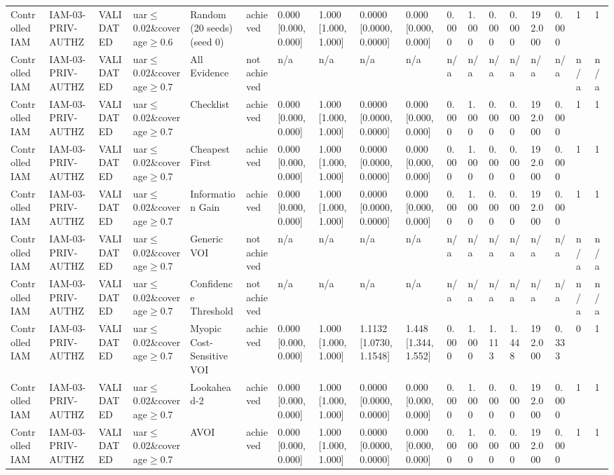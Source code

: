 \begin{table}[!ht]
{\begin{tabular}{llllllllllllllllll}
Controlled IAM & IAM-03-PRIV-AUTHZ & VALIDATED & uar$\le$0.02\&coverage$\ge$0.6 & Random (20 seeds) (seed 0) & achieved & 0.000 [0.000, 0.000] & 1.000 [1.000, 1.000] & 0.0000 [0.0000, 0.0000] & 0.000 [0.000, 0.000] & 0.000 & 1.000 & 0.000 & 0.000 & 192.000 & 0.000 & 1 & 1 \\
Controlled IAM & IAM-03-PRIV-AUTHZ & VALIDATED & uar$\le$0.02\&coverage$\ge$0.7 & All Evidence & not achieved & n/a & n/a & n/a & n/a & n/a & n/a & n/a & n/a & n/a & n/a & n/a & n/a \\
Controlled IAM & IAM-03-PRIV-AUTHZ & VALIDATED & uar$\le$0.02\&coverage$\ge$0.7 & Checklist & achieved & 0.000 [0.000, 0.000] & 1.000 [1.000, 1.000] & 0.0000 [0.0000, 0.0000] & 0.000 [0.000, 0.000] & 0.000 & 1.000 & 0.000 & 0.000 & 192.000 & 0.000 & 1 & 1 \\
Controlled IAM & IAM-03-PRIV-AUTHZ & VALIDATED & uar$\le$0.02\&coverage$\ge$0.7 & Cheapest First & achieved & 0.000 [0.000, 0.000] & 1.000 [1.000, 1.000] & 0.0000 [0.0000, 0.0000] & 0.000 [0.000, 0.000] & 0.000 & 1.000 & 0.000 & 0.000 & 192.000 & 0.000 & 1 & 1 \\
Controlled IAM & IAM-03-PRIV-AUTHZ & VALIDATED & uar$\le$0.02\&coverage$\ge$0.7 & Information Gain & achieved & 0.000 [0.000, 0.000] & 1.000 [1.000, 1.000] & 0.0000 [0.0000, 0.0000] & 0.000 [0.000, 0.000] & 0.000 & 1.000 & 0.000 & 0.000 & 192.000 & 0.000 & 1 & 1 \\
Controlled IAM & IAM-03-PRIV-AUTHZ & VALIDATED & uar$\le$0.02\&coverage$\ge$0.7 & Generic VOI & not achieved & n/a & n/a & n/a & n/a & n/a & n/a & n/a & n/a & n/a & n/a & n/a & n/a \\
Controlled IAM & IAM-03-PRIV-AUTHZ & VALIDATED & uar$\le$0.02\&coverage$\ge$0.7 & Confidence Threshold & not achieved & n/a & n/a & n/a & n/a & n/a & n/a & n/a & n/a & n/a & n/a & n/a & n/a \\
Controlled IAM & IAM-03-PRIV-AUTHZ & VALIDATED & uar$\le$0.02\&coverage$\ge$0.7 & Myopic Cost-Sensitive VOI & achieved & 0.000 [0.000, 0.000] & 1.000 [1.000, 1.000] & 1.1132 [1.0730, 1.1548] & 1.448 [1.344, 1.552] & 0.000 & 1.000 & 1.113 & 1.448 & 192.000 & 0.333 & 0 & 1 \\
Controlled IAM & IAM-03-PRIV-AUTHZ & VALIDATED & uar$\le$0.02\&coverage$\ge$0.7 & Lookahead-2 & achieved & 0.000 [0.000, 0.000] & 1.000 [1.000, 1.000] & 0.0000 [0.0000, 0.0000] & 0.000 [0.000, 0.000] & 0.000 & 1.000 & 0.000 & 0.000 & 192.000 & 0.000 & 1 & 1 \\
Controlled IAM & IAM-03-PRIV-AUTHZ & VALIDATED & uar$\le$0.02\&coverage$\ge$0.7 & AVOI & achieved & 0.000 [0.000, 0.000] & 1.000 [1.000, 1.000] & 0.0000 [0.0000, 0.0000] & 0.000 [0.000, 0.000] & 0.000 & 1.000 & 0.000 & 0.000 & 192.000 & 0.000 & 1 & 1 \\

\end{tabular}}
\end{table}
